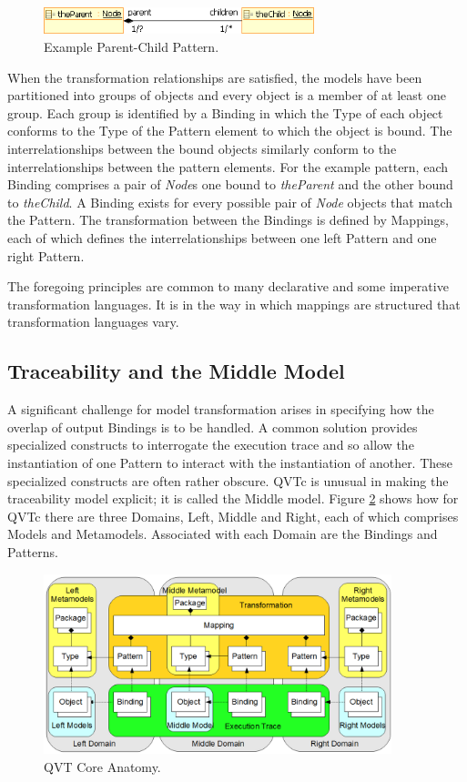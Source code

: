 \begin{figure}[h]
	\centering
	\includegraphics[width=0.7\textwidth]{pattern.png}
	\caption{Example Parent-Child Pattern.}
	\label{fig:pattern}
\end{figure}

When the transformation relationships are satisfied, the models have been partitioned into groups of objects and every object is a member of at least one group. Each group is identified by a Binding in which the Type of each object conforms to the Type of the Pattern element to which the object is bound. The interrelationships between the bound objects similarly conform to the interrelationships between the pattern elements. For the example pattern, each Binding comprises a pair of \textit{Node}s one bound to \textit{theParent} and the other bound to \textit{theChild}. A Binding exists for every possible pair of \textit{Node} objects that match the Pattern. The transformation between the Bindings is defined by Mappings, each of which defines the interrelationships between one left Pattern and one right Pattern.


The foregoing principles are common to many declarative and some imperative transformation languages. It is in the way in which mappings are structured that transformation languages vary.

\subsection{Traceability and the Middle Model}
A significant challenge for model transformation arises in specifying how the overlap of output Bindings is to be handled. A common solution provides specialized constructs to interrogate the execution trace and so allow the instantiation of one Pattern to interact with the instantiation of another. These specialized constructs are often rather obscure. QVTc is unusual in making the traceability model explicit; it is called the Middle model. Figure \ref{fig:QVTCoreAnatomy} shows how for QVTc there are three Domains, Left, Middle and Right, each of which comprises Models and Metamodels. Associated with each Domain are the Bindings and Patterns.

\begin{figure}[h]
	\centering
	\includegraphics[width=0.9\textwidth]{QVTcore.png}
	\caption{QVT Core Anatomy.}
	\label{fig:QVTCoreAnatomy}
\end{figure}

